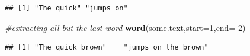 \documentclass[]{book}
\newenvironment{Shaded}{\begin{snugshade}}{\end{snugshade}}
\newcommand{\KeywordTok}[1]{\textcolor[rgb]{0.13,0.29,0.53}{\textbf{{#1}}}}
\newcommand{\DataTypeTok}[1]{\textcolor[rgb]{0.13,0.29,0.53}{{#1}}}
\newcommand{\DecValTok}[1]{\textcolor[rgb]{0.00,0.00,0.81}{{#1}}}
\newcommand{\CommentTok}[1]{\textcolor[rgb]{0.56,0.35,0.01}{\textit{{#1}}}}
\newcommand{\NormalTok}[1]{{#1}}
\begin{document}
\begin{verbatim}
## [1] "The quick" "jumps on"
\end{verbatim}

\begin{Shaded}
\begin{Highlighting}[]
\CommentTok{#extracting all but the last word}
\KeywordTok{word}\NormalTok{(some.text,}\DataTypeTok{start=}\DecValTok{1}\NormalTok{,}\DataTypeTok{end=}\NormalTok{-}\DecValTok{2}\NormalTok{)}
\end{Highlighting}
\end{Shaded}

\begin{verbatim}
## [1] "The quick brown"    "jumps on the brown"
\end{verbatim}
\end{document}

